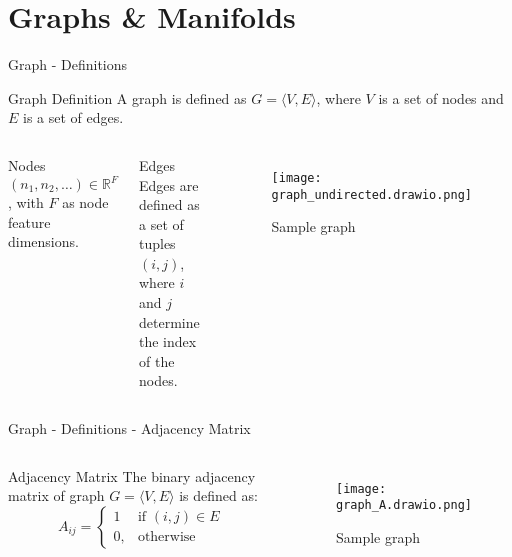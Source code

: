 
\section{Graphs \& Manifolds}

\begin{frame}{Graph - Definitions}

  \begin{block}{Graph Definition}
    A graph is defined as $G = \langle V,E \rangle$, where $V$ is a set of 
    nodes and $E$ is a set of edges. 
  \end{block}

  \pause

  \begin{columns}

    \begin{block}{Nodes}
      $(n_1, n_2, \dots) \in \mathbb{R}^F$, with $F$ as node feature dimensions.
    \end{block}
  
    \begin{block}{Edges}
      Edges are defined as a set of tuples $(i, j)$, where $i$ and $j$ determine 
      the index of the nodes.
    \end{block}

    \begin{figure}
      \centering
      \texttt{[image: graph\_undirected.drawio.png]}
      \caption{Sample graph}        
    \end{figure}
  \end{columns}


  \begin{figure}
    
  \end{figure}

\end{frame}

\begin{frame}{Graph - Definitions - Adjacency Matrix}
\begin{columns}

  \begin{block}{Adjacency Matrix}
    The binary adjacency matrix of graph $G = \langle V, E \rangle$ is defined as:
  \begin{equation}
      \label{eg:AdjacencyMatrix}
      A_{ij} =    
      \begin{cases}
          1  & \text{if } (i, j) \in E \\
          0, & \text{otherwise}
      \end{cases}
  \end{equation}
  \end{block}

  \pause
  
  \begin{figure}
    \centering
    \texttt{[image: graph\_A.drawio.png]}
    \caption{Sample graph}        
  \end{figure}

\end{columns}

\end{frame}

